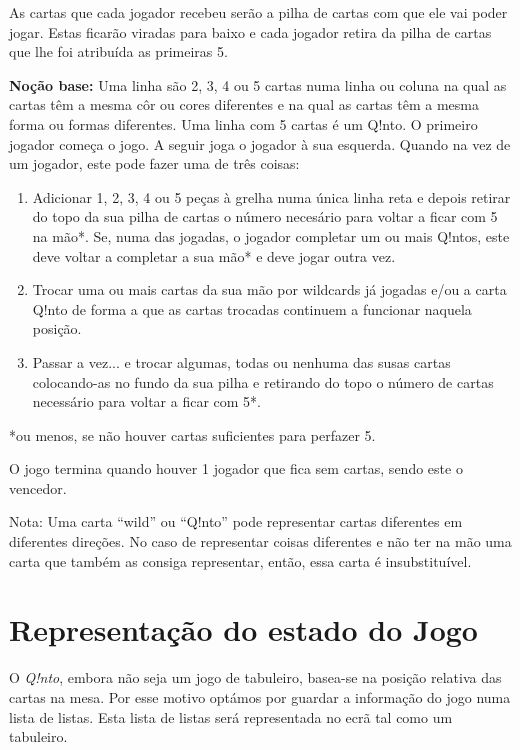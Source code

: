 \documentclass[a4paper]{article}
\begin{document}
	As cartas que cada jogador recebeu serão a pilha de cartas com que ele vai poder jogar. Estas ficarão viradas para baixo e cada jogador retira da pilha de cartas que lhe foi atribuída as primeiras 5. 
	
	\textbf{Noção base:} Uma linha são 2, 3, 4 ou 5 cartas numa linha ou coluna na qual as cartas têm a mesma côr ou cores diferentes e na qual as cartas têm a mesma forma ou formas diferentes. Uma linha com 5 cartas é um Q!nto.
	O primeiro jogador começa o jogo. A seguir joga o jogador à sua esquerda. Quando na vez de um jogador, este pode fazer uma de três coisas:
	
	\begin{enumerate}
	\item 		Adicionar 1, 2, 3, 4 ou 5 peças à grelha numa única linha reta e depois retirar do topo da sua pilha de cartas o número necesário para voltar a ficar com 5 na mão*.
	Se, numa das jogadas, o jogador completar um ou mais Q!ntos, este deve voltar a completar a sua mão* e deve jogar outra vez.
	\item		Trocar uma ou mais cartas da sua mão por wildcards já jogadas e/ou a carta Q!nto de forma a que as cartas trocadas continuem a funcionar naquela posição.
	\item		Passar a vez... e trocar algumas, todas ou nenhuma das susas cartas colocando-as no fundo da sua pilha e retirando do topo o número de cartas necessário para voltar a ficar com 5*.
	\end{enumerate}
	
	\small
	*ou menos, se não houver cartas suficientes para perfazer 5.
	\normalsize
	
	\bigskip
	
	O jogo termina quando houver 1 jogador que fica sem cartas, sendo este o vencedor.\newline
	
	\small
	\noindent
	Nota: Uma carta “wild” ou “Q!nto” pode representar cartas diferentes em diferentes direções. No caso de representar coisas diferentes e não ter na mão uma carta que também as consiga representar, então, essa carta é insubstituível.
	\normalsize
	
	\section{Representação do estado do Jogo}

	O \textit{Q!nto}, embora não seja um jogo de tabuleiro, basea-se na posição relativa das cartas na mesa. Por esse motivo optámos por guardar a informação do jogo numa lista de listas. Esta lista de listas será representada no ecrã tal como um tabuleiro.
	
\end{document}
